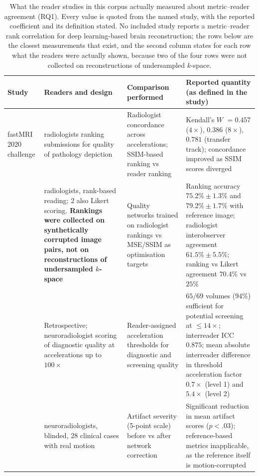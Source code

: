 \documentclass[review,authoryear]{elsarticle}
\begin{document}
\begin{table}[t]
\centering
\caption{What the reader studies in this corpus actually measured about metric--reader
agreement (RQ1). Every value is quoted from the named study, with the reported
coefficient and its definition stated. No included study reports a metric--reader rank
correlation for deep learning-based brain reconstruction; the rows below are the closest
measurements that exist, and the second column states for each row what the readers were
actually shown, because two of the four rows were not collected on reconstructions of
undersampled $k$-space.}
\label{tab:rq1_synthesis}
\small
\setlength{\tabcolsep}{5pt}
\renewcommand{\arraystretch}{1.18}
\begin{tabular}{>{\raggedright\arraybackslash}p{} >{\raggedright\arraybackslash}p{} >{\raggedright\arraybackslash}p{} >{\raggedright\arraybackslash}p{}}
\hline
\textbf{Study} & \textbf{Readers and design} & \textbf{Comparison performed} & \textbf{Reported quantity (as defined in the study)} \\
\hline
fastMRI 2020 challenge \citep{muckley2021results} & 6 radiologists ranking submissions for quality of pathology depiction & Radiologist concordance across accelerations; SSIM-based ranking vs reader ranking & Kendall's $W$ $= 0.457$ ($4\times$), $0.386$ ($8\times$), $0.781$ (transfer track); concordance improved as SSIM scores diverged \\
\hline
\citet{tang2025incorporating} & 7 radiologists, rank-based reading; 2 also Likert scoring. \textbf{Rankings were collected on synthetically corrupted image pairs, not on reconstructions of undersampled $k$-space} & Quality networks trained on radiologist rankings vs MSE/SSIM as optimisation targets & Ranking accuracy $75.2\%\pm1.3\%$ and $79.2\%\pm1.7\%$ with reference image; radiologist interobserver agreement $61.5\%\pm5.5\%$; ranking vs Likert agreement $70.4\%$ vs $25\%$ \\
\hline
\citet{radmanesh2022exploring} & Retrospective; neuroradiologist scoring of diagnostic quality at accelerations up to $100\times$ & Reader-assigned acceleration thresholds for diagnostic and screening quality & $65/69$ volumes ($94\%$) sufficient for potential screening at $\le 14\times$; interreader ICC $0.875$; mean absolute interreader difference in threshold acceleration factor $0.7\times$ (level 1) and $5.4\times$ (level 2) \\
\hline
\citet{sommer2020correction} & 2 neuroradiologists, blinded, 28 clinical cases with real motion & Artifact severity (5-point scale) before vs after network correction & Significant reduction in mean artifact scores ($p<.03$); reference-based metrics inapplicable, as the reference itself is motion-corrupted \\
\hline
\end{tabular}
\end{table}
\end{document}
